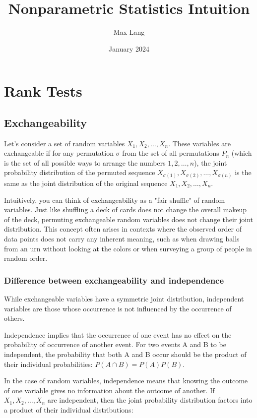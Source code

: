 \documentclass{article}
\title{Nonparametric Statistics Intuition}
\author{Max Lang}
\date{January 2024}
\begin{document}
\maketitle

\section{Rank Tests}
\subsection{Exchangeability}
Let's consider a set of random variables \(X_1, X_2, \ldots, X_n\). These variables are exchangeable if for any permutation \( \sigma \) from the set of all permutations \(P_n\) (which is the set of all possible ways to arrange the numbers \(1, 2, \ldots, n\)), the joint probability distribution of the permuted sequence \(X_{\sigma(1)}, X_{\sigma(2)}, \ldots, X_{\sigma(n)}\) is the same as the joint distribution of the original sequence \(X_1, X_2, \ldots, X_n\).

Intuitively, you can think of exchangeability as a "fair shuffle" of random variables. Just like shuffling a deck of cards does not change the overall makeup of the deck, permuting exchangeable random variables does not change their joint distribution. This concept often arises in contexts where the observed order of data points does not carry any inherent meaning, such as when drawing balls from an urn without looking at the colors or when surveying a group of people in random order.
\subsubsection{Difference between exchangeability and independence}
While exchangeable variables have a symmetric joint distribution, independent variables are those whose occurrence is not influenced by the occurrence of others.

Independence implies that the occurrence of one event has no effect on the probability of occurrence of another event. For two events A and B to be independent, the probability that both A and B occur should be the product of their individual probabilities: \( P(A \cap B) = P(A)P(B) \).

In the case of random variables, independence means that knowing the outcome of one variable gives no information about the outcome of another. If \(X_1, X_2, \ldots, X_n\) are independent, then the joint probability distribution factors into a product of their individual distributions:
\end{document}
